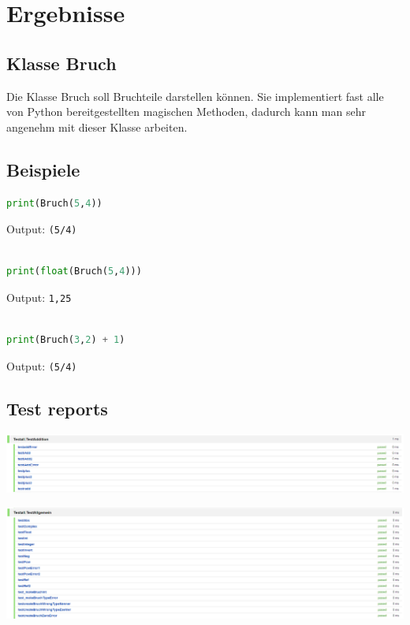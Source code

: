 
\section{Ergebnisse}
\subsection{Klasse Bruch}
Die Klasse Bruch soll Bruchteile darstellen können. Sie implementiert fast alle von Python bereitgestellten magischen Methoden, dadurch kann man sehr angenehm mit dieser Klasse arbeiten. 

\subsection{Beispiele} 
\begin{lstlisting}[language=Python]
print(Bruch(5,4))
\end{lstlisting}
Output: \verb|(5/4)|
\\\\


\begin{lstlisting}[language=Python]
print(float(Bruch(5,4)))
\end{lstlisting}
Output: \verb|1,25|
\\\\


\begin{lstlisting}[language=Python]
print(Bruch(3,2) + 1)
\end{lstlisting}
Output: \verb|(5/4)|

\subsection{Test reports}

\begin{minipage}{\linewidth}
	\centering
	\includegraphics[width=1.1\linewidth]{images/testAddition}
\end{minipage}

\begin{minipage}{\linewidth}
	\centering
	\includegraphics[width=1.1\linewidth]{images/testAllgemein}
\end{minipage}

